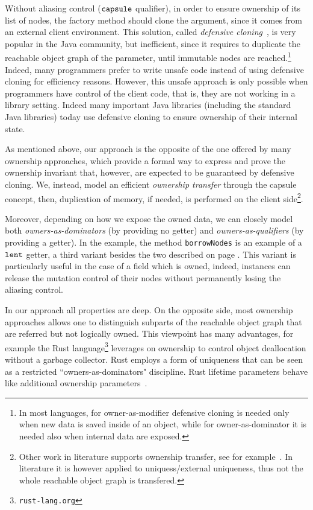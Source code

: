 Without aliasing control ($\texttt{capsule}$ qualifier),  in order to ensure ownership of its list of nodes, the {factory method} should clone the argument, since it comes from an external client environment.
This solution, called  \label{cloning} \emph{defensive cloning}~\cite{Bloch08}, is very popular in the Java community, but inefficient,
since it requires to duplicate the reachable object
graph of the parameter, until immutable nodes are
reached.\footnote{{In most languages, for owner-as-modifier defensive cloning is needed
only when new data is saved inside of an object, while for owner-as-dominator it is needed also when internal data are exposed.}}
Indeed, many programmers prefer to write {unsafe}
 code instead of using defensive cloning for efficiency reasons.
However, this unsafe approach is only possible when programmers have control of the client code, that is, they are not 
working in a library setting.
Indeed many important Java libraries (including the standard Java libraries) today
use defensive cloning to ensure ownership of their internal state.

As mentioned above, our approach is the opposite of the one offered by many ownership approaches, which provide a formal way to express  and prove the ownership invariant that, however, are expected to be guaranteed by defensive cloning. 
We, instead, model an efficient \emph{ownership transfer} through the capsule concept, then, 
duplication of memory, if needed, is performed on the client side\footnote{
Other work in literature supports ownership transfer, see for example~\cite{MullerRudich07, ClarkeWrigstad03}.
In literature it is however applied to uniquess/external uniqueness, thus not {the whole} reachable object graph is transfered.
}.

Moreover, depending on how we expose the owned data, we can closely model
both \emph{owners-as-dominators} (by providing no getter)
and \emph{owners-as-qualifiers} (by providing a \Q@read@ getter). In the example, the method \lstinline{borrowNodes}{} is an example of a $\texttt{lent}$ getter, a third variant besides the two described on page \pageref{exposer}.  This variant is particularly useful in the case of a field which is owned, indeed, \Q@Graph@ instances can release the mutation control of their nodes without permanently {losing} the aliasing control.

In our approach all properties are deep. On the opposite side, most ownership approaches allows one to distinguish
subparts of the reachable object graph that are referred but not logically owned. This viewpoint has many advantages, for example the Rust language\footnote{\texttt{rust-lang.org}} leverages on ownership to control object deallocation without a garbage collector.
Rust employs a form of uniqueness that can be seen as a restricted ``owners-as-dominators" discipline.  
Rust lifetime parameters behave like additional ownership parameters~\cite{OstlundEtAl08}.


